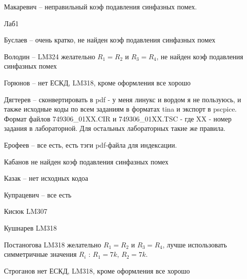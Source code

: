 \documentclass[a4paper,11pt]{article}
\begin{document}
Макаревич -- неправильный коэф подавления синфазных помех.

\newpage
Лаб1 

Буслаев  -- очень кратко, не найден коэф подавления синфазных помех

Володин -- LM324  желательно $R_1=R_2$ и $R_3=R_4$, не найден коэф подавления синфазных помех

Горюнов  -- нет ЕСКД, LM318, кроме оформления все хорошо

Дягтерев -- сконвертировать в pdf - у меня линукс и вордом я не пользуюсь, и также исходные коды по всем заданиям в форматах tina и экспорт в pscpice. Формат файлов 749306\_01XX.CIR 
и 749306\_01XX.TSC - где XX - номер задания в лабораторной. Для остальных лабораторных такие же правила. 

Ерофеев -- все есть, есть тэги pdf-файла для индексации.

Кабанов  не найден коэф подавления синфазных помех

Казак -- нет исходных кодоа

Купрацевич -- все есть

Кисюк LM307

Кушнарев LM318

Постаногова LM318 желательно $R_1=R_2$ и $R_3=R_4$, лучше использовать симметричные значения $R_i$ : $R_1=7k$, $R_2=7k$. 

Строганов нет ЕСКД, LM318, кроме оформления все хорошо
\end{document}
